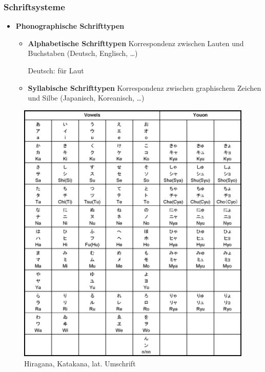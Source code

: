 \begin{frame}
\frametitle{Schriftsysteme}

\begin{minipage}{.4\textwidth}

\begin{itemize}
	\item \textbf{Phonographische Schrifttypen}
	
	\begin{itemize}
		\item \textbf{Alphabetische Schrifttypen} \ras Korrespondenz zwischen Lauten und Buchstaben (Deutsch, Englisch, \dots)
		
		Deutsch:  für Laut \textipa{[k]}
		
		\item \textbf{Syllabische Schrifttypen} \ras Korrespondenz zwischen graphischem Zeichen und Silbe (Japanisch, Koreanisch, \dots)
		
		
	\end{itemize}
\end{itemize}

\end{minipage}\hfill%
\begin{minipage}{.58\textwidth}


\begin{figure}
	\centering
	
	\includegraphics[scale=.114]{material/04japaneseroman}
	\caption{Hiragana, Katakana, lat. Umschrift}
\end{figure}


\end{minipage}
\end{frame}
